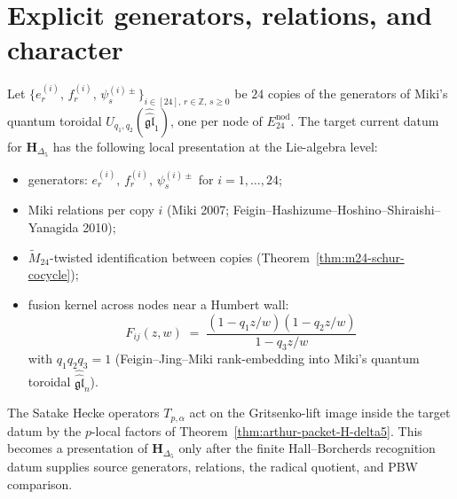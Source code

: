 \section{Explicit generators, relations, and character}
\label{sec:k3-24miki-presentation}

\begin{theorem}
\label{thm:k3-24miki-presentation}
Let $\{e^{(i)}_r,\, f^{(i)}_r,\, \psi^{(i)\pm}_s\}_{i\in[24],\, r\in\mathbb{Z},\, s\geq 0}$
be $24$ copies of the generators of Miki's quantum toroidal
$U_{q_1,q_2}(\widehat{\widehat{\mathfrak{gl}}}_1)$, one per node of $E^{\mathrm{nod}}_{24}$.
The target current datum for $\mathbf{H}_{\Delta_5}$ has the following
local presentation at the Lie-algebra level:
\begin{itemize}
\item generators: $e^{(i)}_r,\, f^{(i)}_r,\, \psi^{(i)\pm}_s$ for $i=1,\dots,24$;
\item Miki relations per copy $i$ (Miki 2007; Feigin--Hashizume--Hoshino--Shiraishi--Yanagida
 2010);
\item $\widetilde{M}_{24}$-twisted identification between copies
 (Theorem~\ref{thm:m24-schur-cocycle});
\item fusion kernel across nodes near a Humbert wall:
 \[
 F_{ij}(z,w)
 \;=\;
 \frac{(1-q_1 z/w)(1-q_2 z/w)}{1-q_3 z/w}
 \]
 with $q_1 q_2 q_3 = 1$ (Feigin--Jing--Miki rank-embedding into
 Miki's quantum toroidal $\widehat{\widehat{\mathfrak{gl}}}_n$).
\end{itemize}
The Satake Hecke operators $T_{p,\alpha}$ act on the Gritsenko-lift image inside
the target datum by the $p$-local factors of
Theorem~\ref{thm:arthur-packet-H-delta5}.  This becomes a presentation of
$\mathbf{H}_{\Delta_5}$ only after the finite Hall--Borcherds recognition
datum supplies source generators, relations, the radical quotient, and PBW
comparison.
\end{theorem}


